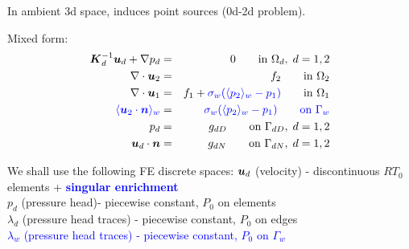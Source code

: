 In ambient 3d space, induces point sources (0d-2d problem).
  
  Mixed form:
  \begin{eqnarray}
\mathbf{\boldsymbol{K}}_d^{-1}\mathbf{\boldsymbol{u}}_d + \nabla p_d &=& 0 \qquad \textrm{in } \Omega_d,\; d=1,2  \\
\nabla \cdot \mathbf{\boldsymbol{u}}_2 &=& f_2 \qquad \textrm{in } \Omega_2\\
\nabla \cdot \mathbf{\boldsymbol{u}}_1 &=& f_1 + {\color{blue}\sigma_w(\langle p_2\rangle_w-p_1)}\qquad \textrm{in } \Omega_1\\
\color{blue}\langle\mathbf{\boldsymbol{u}}_2 \cdot \mathbf{\boldsymbol{n}}\rangle_w &=& \color{blue}\sigma_w (\langle p_2\rangle_w - p_{1}) \qquad \textrm{on } \Gamma_w\\
p_d &=& g_{dD} \qquad \textrm{on } \Gamma_{dD},\; d=1,2 \\
\mathbf{\boldsymbol{u}}_d \cdot \mathbf{\boldsymbol{n}} &=& g_{dN} \qquad \textrm{on } \Gamma_{dN},\; d=1,2
  \end{eqnarray}
  
  
  We shall use the following FE discrete spaces:
  $\mathbf{\boldsymbol{u}}_d$ (velocity) - discontinuous $RT_0$ elements + \textcolor{blue}{\bf singular enrichment}\\
  $p_d$ (pressure head)- piecewise constant, $P_0$ on elements \\
  $\lambda_d$ (pressure head traces) - piecewise constant, $P_0$ on edges \\
  \textcolor{blue}{$\lambda_w$ (pressure head traces) - piecewise constant, $P_0$ on $\Gamma_w$}
  
